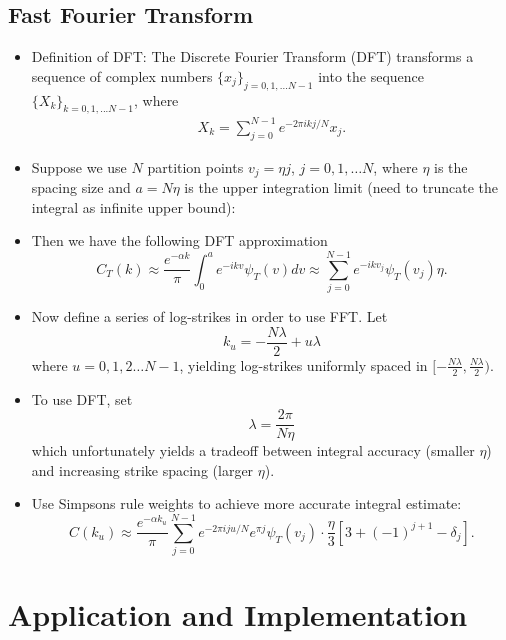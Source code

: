\documentclass[11pt]{article}
\begin{document}
		\subsection{Fast Fourier Transform}	
		\begin{itemize}
			\item	Definition of DFT: The Discrete Fourier Transform (DFT) transforms a sequence of complex numbers \( \{x_j\}_{j = 0,1,...N-1} \) into the sequence \(\{X_{k}\}_{k=0,1,...N-1}\), where 
			\begin{align}
				X_{k} = \sum_{j = 0}^{N - 1}e^{-2\pi i k j/ N}x_{j}.\label{eq:1}
			\end{align} 
			\item Suppose we use \( N \) partition points $v_j = \eta j$, $j=0, 1, \ldots N$, where $\eta$ is the spacing size and \( a = N\eta \) is the upper integration limit (need to truncate the integral as infinite upper bound):
			\item Then we have the following DFT approximation
			\[	C_{T}(k)\approx \frac{e^{-\alpha k}}{\pi}\int_{0}^{a} e^{-ikv}\psi_{T}(v)dv \approx \sum_{j=0}^{N-1}e^{-ikv_j}\psi_{T}(v_j)\eta.
					\]
			\item Now define a series of log-strikes in order to use FFT. Let 
			\[	k_u = -\frac{N\lambda}{2} + u\lambda
					\]
			where $u=0,1,2\ldots N - 1$, yielding log-strikes uniformly spaced in \( [-\frac{N\lambda}{2}, \frac{N\lambda}{2}) \).
			\item To use DFT, set 
			\[	\lambda = \frac{2\pi }{N\eta}
					\]
			which unfortunately yields a tradeoff between integral accuracy (smaller \( \eta \)) and increasing strike spacing (larger \( \eta \)).
			\item Use Simpsons rule weights to achieve more accurate integral estimate:
			\[	C(k_u) \approx \frac{e^{-\alpha k_u}}{\pi}\sum_{j=0}^{N-1} e^{-2\pi iju/N}e^{\pi j} \psi_{T}(v_j)\cdot \frac{\eta}{3}\left[3 + (-1)^{j+1} - \delta_{j}\right].
					\]
  		\end{itemize}
		
		\section{Application and Implementation}
\end{document}
